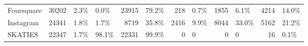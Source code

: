 \begin{tabular}{lrllrlrlrlrl}
Foursquare          &       30202 &        2.3\% &                 0.0\% &             23915 &             79.2\% &               218 &              0.7\% &              1855 &              6.1\% &             4214 &            14.0\% \\
Instagram           &       24341 &        1.8\% &                 1.7\% &              8719 &             35.8\% &              2416 &              9.9\% &              8044 &             33.0\% &             5162 &            21.2\% \\
SKATIES             &       22347 &        1.7\% &                98.1\% &             22331 &             99.9\% &                 0 &                 0 &                 0 &                 0 &               16 &             0.1\% \\
\bottomrule
\end{tabular}
